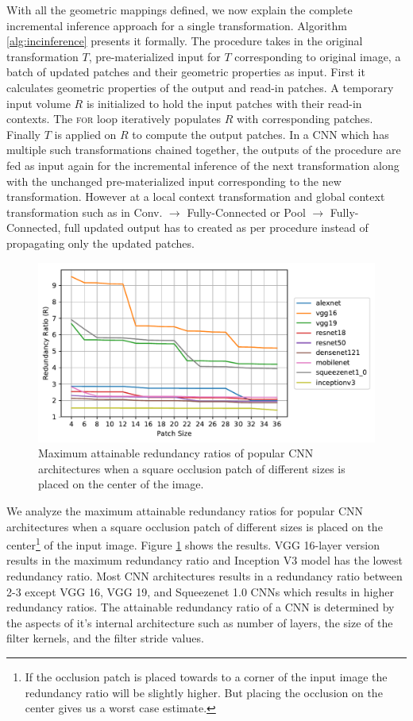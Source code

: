 With all the geometric mappings defined, we now explain the complete incremental inference approach for a single transformation. Algorithm \ref{alg:incinference} presents it formally.
The  procedure takes in the original transformation $T$, pre-materialized input for $T$ corresponding to original image, a batch of updated patches and their geometric properties as input.
First it calculates geometric properties of the output and read-in patches.
A temporary input volume $R$ is initialized to hold the input patches with their read-in contexts.
The \textsc{for} loop iteratively populates $R$ with corresponding patches.
Finally $T$ is applied on $R$ to compute the output patches.
In a CNN which has multiple such transformations chained together, the outputs of the  procedure are fed as input again for the incremental inference of the next transformation along with the unchanged pre-materialized input corresponding to the new transformation.
However at a local context transformation and global context transformation such as in Conv. $	\rightarrow$ Fully-Connected or Pool $\rightarrow$ Fully-Connected, full updated output has to created as per  procedure instead of propagating only the updated patches.

\begin{figure}[t]
\includegraphics[width=\columnwidth]{images/redundancy_ratio}
\caption{Maximum attainable redundancy ratios of popular CNN architectures when a square occlusion patch of different sizes is placed on the center of the image.}
\label{fig:redundancy_ratio}
\end{figure}

We analyze the maximum attainable redundancy ratios for popular CNN architectures when a square occlusion patch of different sizes is placed on the center\footnote{If the occlusion patch is placed towards to a corner of the input image the redundancy ratio will be slightly higher. But placing the occlusion on the center gives us a worst case estimate.} of the input image. Figure \ref{fig:redundancy_ratio} shows the results. VGG 16-layer version results in the maximum redundancy ratio and Inception V3 model has the lowest redundancy ratio. Most CNN architectures results in a redundancy ratio between 2-3 except VGG 16, VGG 19, and Squeezenet 1.0 CNNs which results in higher redundancy ratios. The attainable redundancy ratio of a CNN is determined by the aspects of it's internal architecture such as number of layers, the size of the filter kernels, and the filter stride values.


